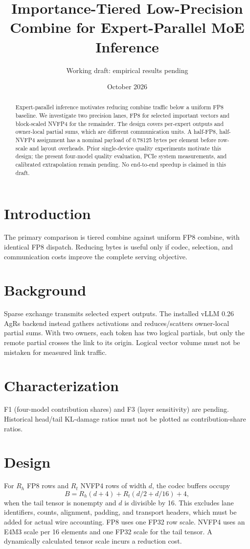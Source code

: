 \documentclass[10pt,twocolumn]{article}
\title{Importance-Tiered Low-Precision Combine for Expert-Parallel MoE Inference}
\author{Working draft: empirical results pending}
\date{October 2026}
\begin{document}
\maketitle
\begin{abstract}
Expert-parallel inference motivates reducing combine traffic below a uniform FP8 baseline. We investigate two precision lanes, FP8 for selected important vectors and block-scaled NVFP4 for the remainder. The design covers per-expert outputs and owner-local partial sums, which are different communication units. A half-FP8, half-NVFP4 assignment has a nominal payload of 0.78125 bytes per element before row-scale and layout overheads. Prior single-device quality experiments motivate this design; the present four-model quality evaluation, PCIe system measurements, and calibrated extrapolation remain pending. No end-to-end speedup is claimed in this draft.
\end{abstract}
\section{Introduction}
The primary comparison is tiered combine against uniform FP8 combine, with identical FP8 dispatch. Reducing bytes is useful only if codec, selection, and communication costs improve the complete serving objective.
\section{Background}
Sparse exchange transmits selected expert outputs. The installed vLLM 0.26 AgRs backend instead gathers activations and reduces/scatters owner-local partial sums. With two owners, each token has two logical partials, but only the remote partial crosses the link to its origin. Logical vector volume must not be mistaken for measured link traffic.
\section{Characterization}
F1 (four-model contribution shares) and F3 (layer sensitivity) are pending. Historical head/tail KL-damage ratios must not be plotted as contribution-share ratios.
\section{Design}
For $R_h$ FP8 rows and $R_t$ NVFP4 rows of width $d$, the codec buffers occupy
\[
 B=R_h(d+4)+R_t(d/2+d/16)+4,
\]
when the tail tensor is nonempty and $d$ is divisible by 16. This excludes lane identifiers, counts, alignment, padding, and transport headers, which must be added for actual wire accounting. FP8 uses one FP32 row scale. NVFP4 uses an E4M3 scale per 16 elements and one FP32 scale for the tail tensor. A dynamically calculated tensor scale incurs a reduction cost.
\end{document}
